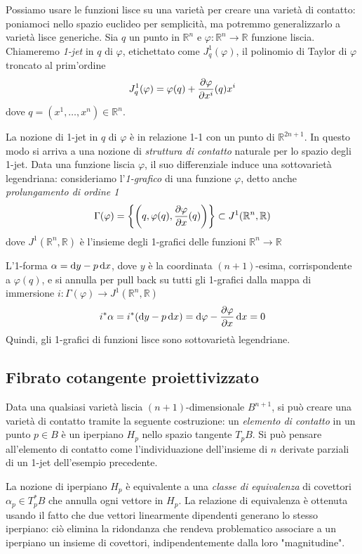 Possiamo usare le funzioni lisce su una varietà per creare una varietà di contatto: poniamoci nello spazio euclideo per semplicità, ma potremmo generalizzarlo a varietà lisce generiche.
Sia $q$ un punto in $\mathbb{R}^n$ e $\varphi : \mathbb{R}^n \longrightarrow \mathbb{R}$ funzione liscia. Chiameremo \emph{1-jet} in $q$ di $\varphi$, etichettato come $J^1_q (\varphi)$, il polinomio di Taylor di $\varphi$ troncato al prim'ordine
\[
    J^1_q(\varphi) = \varphi(q) + \pdv{\varphi}{x^i} (q) x^i
\]
dove $ q = (x^1, \dots, x^n) \in \mathbb{R}^n $.

La nozione di 1-jet in $q$ di $\varphi$ è in relazione 1-1 con un punto di $\mathbb{R}^{2n + 1}$.
In questo modo si arriva a una nozione di \emph{struttura di contatto} naturale per lo spazio degli 1-jet.
Data una funzione liscia $\varphi$, il suo differenziale induce una sottovarietà legendriana: consideriamo l'\emph{1-grafico} di una funzione $\varphi$, detto anche \emph{prolungamento di ordine 1}
\[
    \Gamma(\varphi) = \left\{ \left( q, \varphi(q), \pdv{\varphi}{x}(q) \right) \right\} \subset J^1(\mathbb{R}^n, \mathbb{R})
\]
dove $ J^1(\mathbb{R}^n, \mathbb{R}) $ è l'insieme degli 1-grafici delle funzioni $ \mathbb{R}^n \longrightarrow \mathbb{R} $

L'1-forma $\alpha = \odif{y} - p \odif{x} $, dove $y$ è la coordinata $(n + 1)$-esima, corrispondente a $\varphi(q)$, e si annulla per pull back su tutti gli 1-grafici dalla mappa di immersione $i: \Gamma(\varphi) \longrightarrow J^1(\mathbb{R}^n, \mathbb{R})$
\[
    i^* \alpha = i^* (\odif{y} - p \odif{x}) = \odif{\varphi} - \pdv{\varphi}{x} \odif{x} = 0
\]
Quindi, gli 1-grafici di funzioni lisce sono sottovarietà legendriane.

\subsection{Fibrato cotangente proiettivizzato}

Data una qualsiasi varietà liscia $ (n + 1) $-dimensionale $B^{n + 1}$, si può creare una varietà di contatto tramite la seguente costruzione: un \emph{elemento di contatto} in un punto $p \in B$ è un iperpiano $H_p$ nello spazio tangente $T_p B$.
Si può pensare all'elemento di contatto come l'individuazione dell'insieme di $n$ derivate parziali di un 1-jet dell'esempio precedente.

La nozione di iperpiano $H_p$ è equivalente a una \emph{classe di equivalenza} di covettori $\alpha_p \in T_p^* B$ che annulla ogni vettore in $H_p$.
La relazione di equivalenza è ottenuta usando il fatto che due vettori linearmente dipendenti generano lo stesso iperpiano: ciò elimina la ridondanza che rendeva problematico associare a un iperpiano un insieme di covettori, indipendentemente dalla loro "magnitudine".

